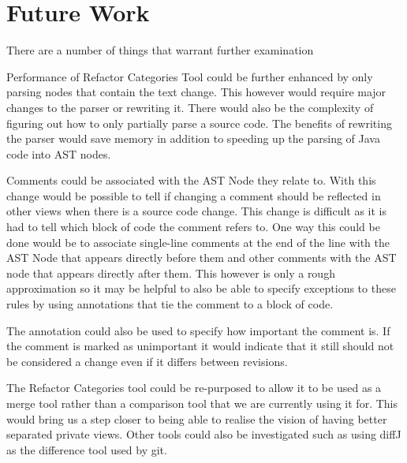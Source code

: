 
\chapter{Future Work}

There are a number of things that warrant further examination 

Performance of Refactor Categories Tool could be further enhanced by only parsing nodes that contain the text change.  This however would require major changes to the parser or rewriting it. There would also be the complexity of figuring out how to only partially parse a source code. The benefits of rewriting the parser would save memory in addition to speeding up the parsing of Java code into AST nodes.


Comments could be associated with the AST Node they relate to.  With this change would be possible to tell if changing a comment should be reflected in other views when there is a source code change. This change is difficult as it is had to tell which block of code the comment refers to.  One way this could be done would be to associate single-line comments at the end of the line with the AST Node that appears directly before them and other comments with the AST node that appears directly after them.  This however is only a rough approximation so it may be helpful to also be able to specify exceptions to these rules by using annotations that tie the comment to a block of code.

The annotation could also be used to specify how important the comment is. If the comment is marked as unimportant it would indicate that it still should not be considered a change even if it differs between revisions.

The Refactor Categories tool could be re-purposed to allow it to be used as a merge tool rather than a comparison tool that we are currently using it for.  This would bring us a step closer to being able to realise the vision of having better separated private views.  Other tools could also be investigated such as using diffJ as the difference tool used by git.
% 
% 
% 
% 





